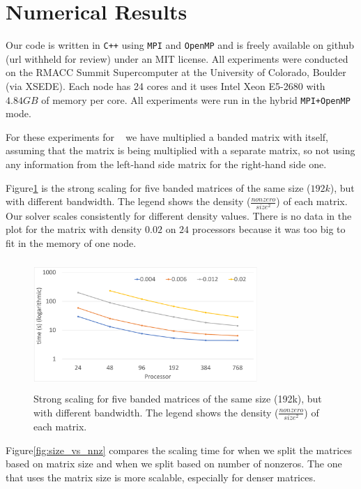 \section{Numerical Results}
\label{sec:results}

Our code is written in \texttt{C++} using \texttt{MPI} and \texttt{OpenMP} and is freely available on github (url withheld for review) under an MIT license. 
All experiments were conducted on the RMACC Summit Supercomputer at the University of Colorado, Boulder (via XSEDE). Each node has 24 cores and it uses Intel Xeon E5-2680 with $4.84GB$ of memory per core. All experiments were run in the hybrid \texttt{MPI+OpenMP} mode. 


For these experiments for \mm~ we have multiplied a banded matrix with itself, assuming that the matrix is being multiplied with a separate matrix, so not using any information from the left-hand side matrix for the right-hand side one.

Figure\ref{fig:strong1} is the strong scaling for five banded matrices of the same size ($192k$), but with different bandwidth. The legend shows the density ($\frac{nonzero}{size^2}$) of each matrix. Our solver scales consistently for different density values. There is no data in the plot for the matrix with density $0.02$ on $24$ processors because it was too big to fit in the memory of one node.

\begin{figure}[tbh]
 \centering
 \includegraphics[width=8.5cm,height=4.9cm]{./figures/strong_size.pdf}
 \caption{Strong scaling for five banded matrices of the same size (192k), but with different bandwidth. The legend shows the density ($\frac{nonzero}{size^2}$) of each matrix.}
 \label{fig:strong1}
\end{figure}

Figure\ref{fig:size_vs_nnz} compares the scaling time for when we split the matrices based on matrix size and when we split based on number of nonzeros. The one that uses the matrix size is more scalable, especially for denser matrices.

